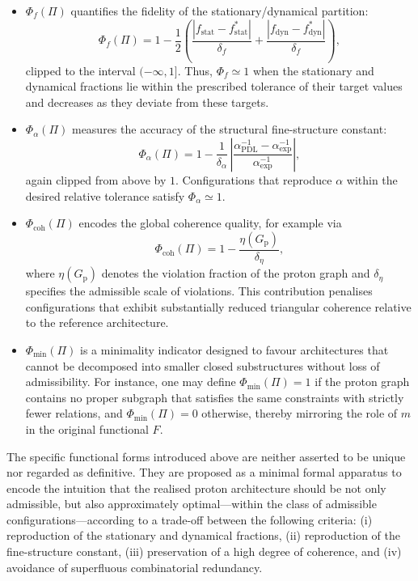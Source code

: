 \documentclass[11pt,a4paper]{article}
\begin{document}
\begin{itemize}
\item $\Phi_f(\Pi)$ quantifies the fidelity of the stationary/dynamical partition:
\begin{equation}
\Phi_f(\Pi) = 1 - \frac{1}{2}\left(\frac{|f_{\mathrm{stat}}-f_{\mathrm{stat}}^{\ast}|}{\delta_f} + \frac{|f_{\mathrm{dyn}}-f_{\mathrm{dyn}}^{\ast}|}{\delta_f}\right),
\end{equation}
clipped to the interval $(-\infty,1]$. Thus, $\Phi_f\simeq 1$ when the stationary and dynamical fractions lie within the prescribed tolerance of their target values and decreases as they deviate from these targets.

\item $\Phi_{\alpha}(\Pi)$ measures the accuracy of the structural fine-structure constant:
\begin{equation}
\Phi_{\alpha}(\Pi) = 1 - \frac{1}{\delta_{\alpha}}\,\left|\frac{\alpha_{\mathrm{PDL}}^{-1}-\alpha_{\mathrm{exp}}^{-1}}{\alpha_{\mathrm{exp}}^{-1}}\right|,
\end{equation}
again clipped from above by $1$. Configurations that reproduce $\alpha$ within the desired relative tolerance satisfy $\Phi_{\alpha}\simeq 1$.

\item $\Phi_{\mathrm{coh}}(\Pi)$ encodes the global coherence quality, for example via
\begin{equation}
\Phi_{\mathrm{coh}}(\Pi) = 1 - \frac{\eta(G_{\mathrm{p}})}{\delta_{\eta}},
\end{equation}
where $\eta(G_{\mathrm{p}})$ denotes the violation fraction of the proton graph and $\delta_{\eta}$ specifies the admissible scale of violations. This contribution penalises configurations that exhibit substantially reduced triangular coherence relative to the reference architecture.

\item $\Phi_{\mathrm{min}}(\Pi)$ is a minimality indicator designed to favour architectures that cannot be decomposed into smaller closed substructures without loss of admissibility. For instance, one may define $\Phi_{\mathrm{min}}(\Pi)=1$ if the proton graph contains no proper subgraph that satisfies the same constraints with strictly fewer relations, and $\Phi_{\mathrm{min}}(\Pi)=0$ otherwise, thereby mirroring the role of $m$ in the original functional $F$.\cite{LaubscherPDLFull2026,LaubscherLDP2026}
\end{itemize}

The specific functional forms introduced above are neither asserted to be unique nor regarded as definitive. They are proposed as a minimal formal apparatus to encode the intuition that the realised proton architecture should be not only admissible, but also approximately optimal—within the class of admissible configurations—according to a trade-off between the following criteria: (i) reproduction of the stationary and dynamical fractions, (ii) reproduction of the fine-structure constant, (iii) preservation of a high degree of coherence, and (iv) avoidance of superfluous combinatorial redundancy.
\end{document}
